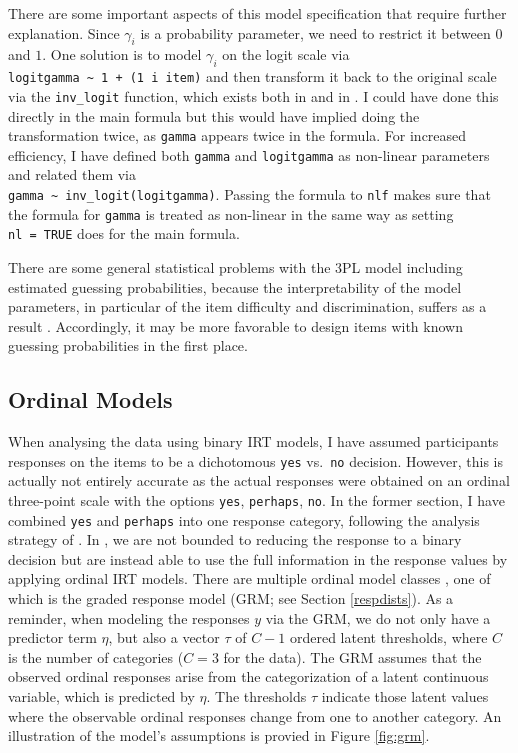 \documentclass[jss]{jss}
\begin{document}
There are some important aspects of this model specification that
require further explanation. Since \(\gamma_i\) is a probability
parameter, we need to restrict it between \(0\) and \(1\). One solution
is to model \(\gamma_i\) on the logit scale via
\texttt{logitgamma\ \textasciitilde{}\ 1\ +\ (1\ \textbar{}i\textbar{}\ item)}
and then transform it back to the original scale via the
\texttt{inv\_logit} function, which exists both in  and in
. I could have done this directly in the main formula but
this would have implied doing the transformation twice, as
\texttt{gamma} appears twice in the formula. For increased efficiency, I
have defined both \texttt{gamma} and \texttt{logitgamma} as non-linear
parameters and related them via\\
\texttt{gamma\ \textasciitilde{}\ inv\_logit(logitgamma)}. Passing the
formula to \texttt{nlf} makes sure that the formula for \texttt{gamma}
is treated as non-linear in the same way as setting \texttt{nl\ =\ TRUE}
does for the main formula.

There are some general statistical problems with the 3PL model including
estimated guessing probabilities, because the interpretability of the
model parameters, in particular of the item difficulty and
discrimination, suffers as a result \citep{han2012}. Accordingly, it may
be more favorable to design items with known guessing probabilities in
the first place.

\hypertarget{ordinal}{%
\subsection{Ordinal Models}\label{ordinal}}

When analysing the  data using binary IRT models, I have
assumed participants responses on the items to be a dichotomous
\texttt{yes} vs.~\texttt{no} decision. However, this is actually not
entirely accurate as the actual responses were obtained on an ordinal
three-point scale with the options \texttt{yes}, \texttt{perhaps},
\texttt{no}. In the former section, I have combined \texttt{yes} and
\texttt{perhaps} into one response category, following the analysis
strategy of \citet{deboeck2011}. In , we are not bounded to
reducing the response to a binary decision but are instead able to use
the full information in the response values by applying ordinal IRT
models. There are multiple ordinal model classes
\citep{agresti2010, buerkner2019}, one of which is the graded response
model (GRM; see Section \ref{respdists}). As a reminder, when modeling
the responses \(y\) via the GRM, we do not only have a predictor term
\(\eta\), but also a vector \(\tau\) of \(C-1\) ordered latent
thresholds, where \(C\) is the number of categories (\(C = 3\) for the
 data). The GRM assumes that the observed ordinal
responses arise from the categorization of a latent continuous variable,
which is predicted by \(\eta\). The thresholds \(\tau\) indicate those
latent values where the observable ordinal responses change from one to
another category. An illustration of the model's assumptions is provied
in Figure \ref{fig:grm}.
\end{document}
